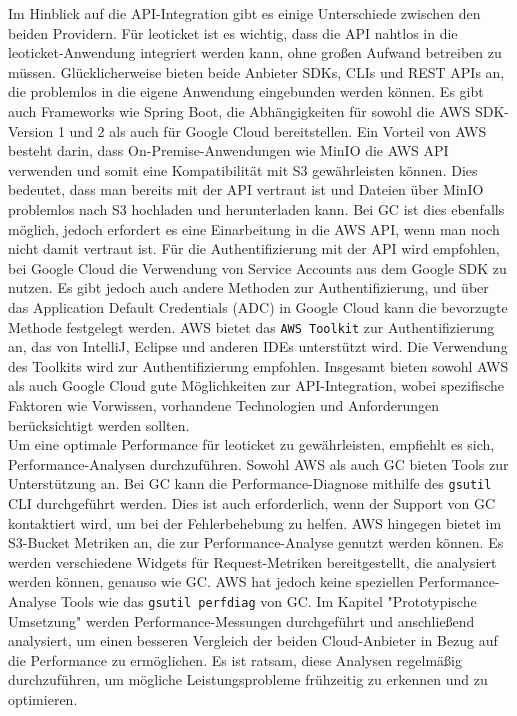 Im Hinblick auf die API-Integration gibt es einige Unterschiede zwischen den beiden Providern. Für leoticket ist es wichtig, dass die API nahtlos in die leoticket-Anwendung integriert werden kann, ohne großen Aufwand betreiben zu müssen. Glücklicherweise bieten beide Anbieter SDKs, CLIs und REST APIs an, die problemlos in die eigene Anwendung eingebunden werden können. Es gibt auch Frameworks wie Spring Boot, die Abhängigkeiten für sowohl die AWS SDK-Version 1 und 2 als auch für Google Cloud bereitstellen. Ein Vorteil von AWS besteht darin, dass On-Premise-Anwendungen wie MinIO die AWS API verwenden und somit eine Kompatibilität mit S3 gewährleisten können. Dies bedeutet, dass man bereits mit der API vertraut ist und Dateien über MinIO problemlos nach S3 hochladen und herunterladen kann. Bei GC ist dies ebenfalls möglich, jedoch erfordert es eine Einarbeitung in die AWS API, wenn man noch nicht damit vertraut ist. Für die Authentifizierung mit der API wird empfohlen, bei Google Cloud die Verwendung von Service Accounts aus dem Google SDK zu nutzen. Es gibt jedoch auch andere Methoden zur Authentifizierung, und über das Application Default Credentials (ADC) in Google Cloud kann die bevorzugte Methode festgelegt werden. AWS bietet das \verb|AWS Toolkit| zur Authentifizierung an, das von IntelliJ, Eclipse und anderen IDEs unterstützt wird. Die Verwendung des Toolkits wird zur Authentifizierung empfohlen. Insgesamt bieten sowohl AWS als auch Google Cloud gute Möglichkeiten zur API-Integration, wobei spezifische Faktoren wie Vorwissen, vorhandene Technologien und Anforderungen berücksichtigt werden sollten.\\

Um eine optimale Performance für leoticket zu gewährleisten, empfiehlt es sich, Performance-Analysen durchzuführen. Sowohl AWS als auch GC bieten Tools zur Unterstützung an. Bei GC kann die Performance-Diagnose mithilfe des \verb|gsutil| CLI durchgeführt werden. Dies ist auch erforderlich, wenn der Support von GC kontaktiert wird, um bei der Fehlerbehebung zu helfen. AWS hingegen bietet im S3-Bucket Metriken an, die zur Performance-Analyse genutzt werden können. Es werden verschiedene Widgets für Request-Metriken bereitgestellt, die analysiert werden können, genauso wie GC. AWS hat jedoch keine speziellen Performance-Analyse Tools wie das \verb|gsutil perfdiag| von GC. Im Kapitel "Prototypische Umsetzung" werden Performance-Messungen durchgeführt und anschließend analysiert, um einen besseren Vergleich der beiden Cloud-Anbieter in Bezug auf die Performance zu ermöglichen. Es ist ratsam, diese Analysen regelmäßig durchzuführen, um mögliche Leistungsprobleme frühzeitig zu erkennen und zu optimieren.\\ 

